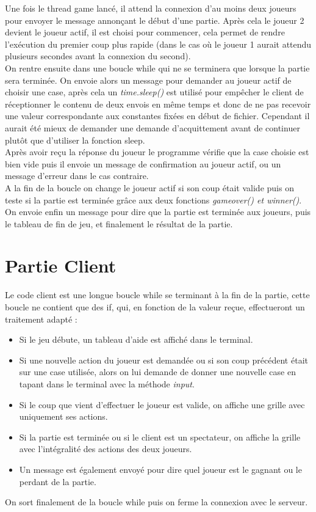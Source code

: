 \documentclass[11pt,a4paper]{report}
\begin{document}
\quad Une fois le thread game lancé, il attend la connexion d'au moins deux joueurs pour envoyer le message annonçant le début d'une partie. Après cela le joueur 2 devient le joueur actif, il est choisi pour commencer, cela permet de rendre l'exécution du premier coup plus rapide (dans le cas où le joueur 1 aurait attendu plusieurs secondes avant la connexion du second).\\
On rentre ensuite dans une boucle while qui ne se terminera que lorsque la partie sera terminée. On envoie alors un message pour demander au joueur actif de choisir une case, après cela un \textit{time.sleep()} est utilisé pour empêcher le client de réceptionner le contenu de deux envois en même temps et donc de ne pas recevoir une valeur correspondante aux constantes fixées en début de fichier. Cependant il aurait été mieux de demander une demande d'acquittement avant de continuer plutôt que d'utiliser la fonction sleep.\\
Après avoir reçu la réponse du joueur le programme vérifie que la case choisie est bien vide puis il envoie un message de confirmation au joueur actif, ou un message d'erreur dans le cas contraire.\\
A la fin de la boucle on change le joueur actif si son coup était valide puis on teste si la partie est terminée grâce aux deux fonctions \textit{gameover() et winner()}.\\
On envoie enfin un message pour dire que la partie est terminée aux joueurs, puis le tableau de fin de jeu, et finalement le résultat de la partie. 

\chapter{Partie Client}

\quad Le code client est une longue boucle while se terminant à la fin de la partie, cette boucle ne contient que des if, qui, en fonction de la valeur reçue, effectueront un traitement adapté :\\
\begin{itemize}
\item Si le jeu débute, un tableau d'aide est affiché dans le terminal.
\item Si une nouvelle action du joueur est demandée ou si son coup précédent était sur une case utilisée, alors on lui demande de donner une nouvelle case en tapant dans le terminal avec la méthode \textit{input}.
\item Si le coup que vient d'effectuer le joueur est valide, on affiche une grille avec uniquement ses actions.
\item Si la partie est terminée ou si le client est un spectateur, on affiche la grille avec l'intégralité des actions des deux joueurs.
\item Un message est également envoyé pour dire quel joueur est le gagnant ou le perdant de la partie.
\end{itemize}
On sort finalement de la boucle while puis on ferme la connexion avec le serveur.
\end{document}
